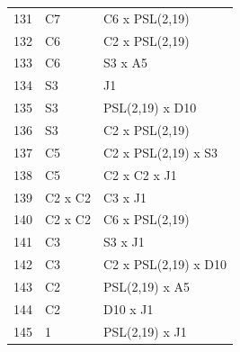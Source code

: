 \documentclass[10pt,a4paper]{article}
\begin{document}
\begin{longtable}{r p{77mm} p{53mm}}
131&C7&C6 x PSL(2,19)\\
132&C6&C2 x PSL(2,19)\\
133&C6&S3 x A5\\
134&S3&J1\\
135&S3&PSL(2,19) x D10\\
136&S3&C2 x PSL(2,19)\\
137&C5&C2 x PSL(2,19) x S3\\
138&C5&C2 x C2 x J1\\
139&C2 x C2&C3 x J1\\
140&C2 x C2&C6 x PSL(2,19)\\
141&C3&S3 x J1\\
142&C3&C2 x PSL(2,19) x D10\\
143&C2&PSL(2,19) x A5\\
144&C2&D10 x J1\\
145&1&PSL(2,19) x J1\\
\bottomrule\end{longtable}
\end{document}
